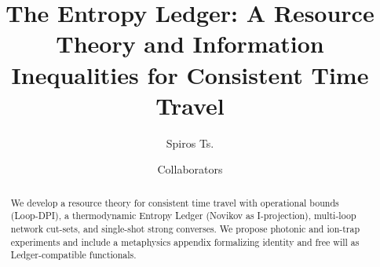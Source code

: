 \documentclass[aps,prl,twocolumn,10pt,superscriptaddress,longbibliography]{revtex4-2}
\begin{document}
\title{The Entropy Ledger: A Resource Theory and Information Inequalities for Consistent Time Travel}

\author{Spiros Ts.}
\author{Collaborators}

\begin{abstract}
We develop a resource theory for consistent time travel with operational bounds (Loop-DPI), a thermodynamic Entropy Ledger (Novikov as I-projection), multi-loop network cut-sets, and single-shot strong converses. We propose photonic and ion-trap experiments and include a metaphysics appendix formalizing identity and free will as Ledger-compatible functionals.
\end{abstract}

\maketitle










\appendix







\end{document}
